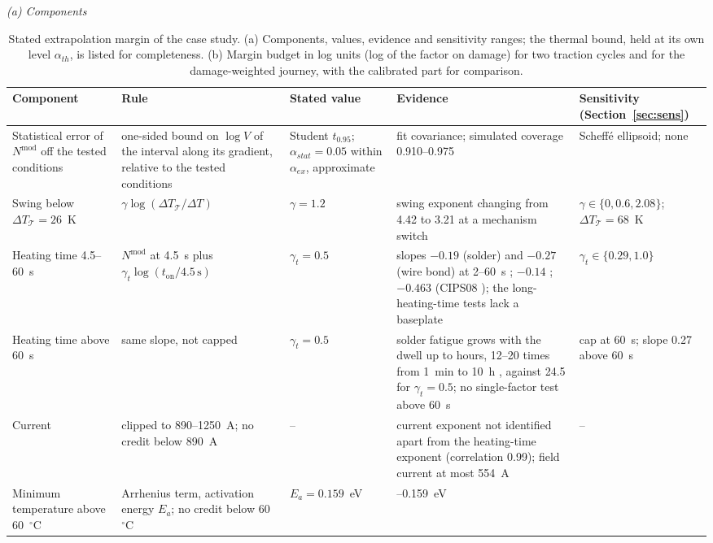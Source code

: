 \begin{table}[tbp]
\centering
\caption{Stated extrapolation margin of the case study. (a) Components, values, evidence and sensitivity ranges; the
thermal bound, held at its own level $\alpha_{th}$, is listed for completeness. (b) Margin budget in log units (log of
the factor on damage) for two traction cycles and for the damage-weighted journey, with the calibrated part for
comparison.}
\label{tab:p3-T5}
\footnotesize
\textit{(a) Components}\\[2pt]
\begin{tabularx}{\textwidth}{@{}>{\raggedright\arraybackslash}p{2.6cm}>{\raggedright\arraybackslash}p{3.5cm}
>{\raggedright\arraybackslash}p{2.0cm}>{\raggedright\arraybackslash}X>{\raggedright\arraybackslash}p{2.9cm}@{}}
\toprule
Component & Rule & Stated value & Evidence & Sensitivity (Section~\ref{sec:sens}) \\
\midrule
Statistical error of $N^{\mathrm{mod}}$ off the tested conditions & one-sided bound on $\log V$ of the interval along
its gradient, relative to the tested conditions & Student $t_{0.95}$; $\alpha_{stat}=0.05$ within $\alpha_{ex}$, approximate &
fit covariance; simulated coverage 0.910--0.975 & Scheff\'e ellipsoid; none \\
\addlinespace
Swing below $\Delta T_{\mathcal T}=26$~K & $\gamma\log(\Delta T_{\mathcal T}/\Delta T)$ & $\gamma=1.2$ & swing exponent
changing from 4.42 to 3.21 at a mechanism switch \cite{scheuermann2018} & $\gamma\in\{0,0.6,2.08\}$;
$\Delta T_{\mathcal T}=68$~K \\
\addlinespace
Heating time 4.5--60~s & $N^{\mathrm{mod}}$ at 4.5~s plus $\gamma_t\log(t_{\mathrm{on}}/4.5\,\mathrm{s})$ &
$\gamma_t=0.5$ & slopes $-0.19$ (solder) and $-0.27$ (wire bond) at 2--60~s \cite{junghaenel2017mr}; $-0.14$
\cite{choi2017}; $-0.463$ (CIPS08 \cite{bayerer2008}); the long-heating-time tests lack a baseplate &
$\gamma_t\in\{0.29,1.0\}$ \\
\addlinespace
Heating time above 60~s & same slope, not capped & $\gamma_t=0.5$ & solder fatigue grows with the dwell up to hours,
12--20 times from 1~min to 10~h \cite{engelmaier1983}, against 24.5 for $\gamma_t=0.5$; no single-factor test above
60~s & cap at 60~s; slope 0.27 above 60~s \\
\addlinespace
Current & clipped to 890--1250~A; no credit below 890~A & -- & current exponent not identified apart from the
heating-time exponent (correlation 0.99); field current at most 554~A & -- \\
\addlinespace
Minimum temperature above 60~$^\circ$C & Arrhenius term, activation energy $E_a$; no credit below 60~$^\circ$C & $E_a=0.159$~eV & 0.069--0.159~eV

\end{tabularx}
\end{table}
